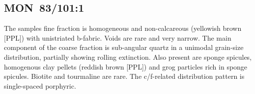 \documentclass[a4paper]{article}
\begin{document}
\subsection{MON~83/101:1 \citep[mon\#50; Fig.~\ref{fig:wafmon.pottery}.1; Monkoto style;][506 Pl.~72.5]{Wotzka.1995}}

\begin{multicols}{2}
\noindent The samples fine fraction is homogeneous and non-calcareous (yellowish brown [PPL]) with unistriated b-fabric. Voids are rare and very narrow. The main component of the coarse fraction is sub-angular quartz in a unimodal grain-size distribution, partially showing rolling extinction. Also present are sponge spicules, homogenous clay pellets (reddish brown [PPL]) and grog particles rich in sponge spicules. Biotite and tourmaline are rare. The c/f-related distribution pattern is single-spaced porphyric.
\end{multicols}
\end{document}
